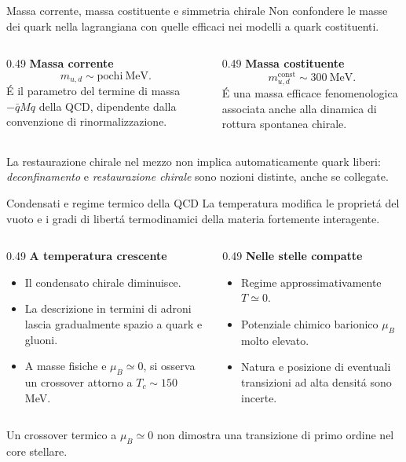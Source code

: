 \begin{frame}{Massa corrente, massa costituente e simmetria chirale}
\small
Non confondere le masse dei quark nella lagrangiana
con quelle efficaci nei modelli a quark costituenti.
\begin{columns}[T,onlytextwidth]
\begin{column}{0.49\textwidth}
\textbf{Massa corrente}
\[
m_{u,d}\sim\mathrm{pochi\ MeV}.
\]
\'E il parametro del termine di massa
$-\bar qMq$ della QCD, dipendente
dalla convenzione di rinormalizzazione.
\end{column}
\begin{column}{0.49\textwidth}
\textbf{Massa costituente}
\[
m_{u,d}^{\mathrm{const}}\sim300\ \mathrm{MeV}.
\]
\'E una massa efficace fenomenologica
associata anche alla dinamica di rottura
spontanea chirale.
\end{column}
\end{columns}
\medskip
La restaurazione chirale nel mezzo non implica automaticamente
quark liberi: \emph{deconfinamento} e \emph{restaurazione chirale}
sono nozioni distinte, anche se collegate.
\end{frame}

\begin{frame}{Condensati e regime termico della QCD}
\small
La temperatura modifica le propriet\'a del vuoto e i gradi di
libert\'a termodinamici della materia fortemente interagente.
\begin{columns}[T,onlytextwidth]
\begin{column}{0.49\textwidth}
\textbf{A temperatura crescente}
\begin{itemize}
\item Il condensato chirale diminuisce.
\item La descrizione in termini di adroni
      lascia gradualmente spazio a quark e gluoni.
\item A masse fisiche e $\mu_B\simeq0$, si osserva
      un crossover attorno a $T_c\sim150$ MeV.
\end{itemize}
\end{column}
\begin{column}{0.49\textwidth}
\textbf{Nelle stelle compatte}
\begin{itemize}
\item Regime approssimativamente $T\simeq0$.
\item Potenziale chimico barionico $\mu_B$
      molto elevato.
\item Natura e posizione di eventuali
      transizioni ad alta densit\'a sono incerte.
\end{itemize}
\end{column}
\end{columns}
\medskip
Un crossover termico a $\mu_B\simeq0$ non dimostra una
transizione di primo ordine nel core stellare.
\end{frame}

